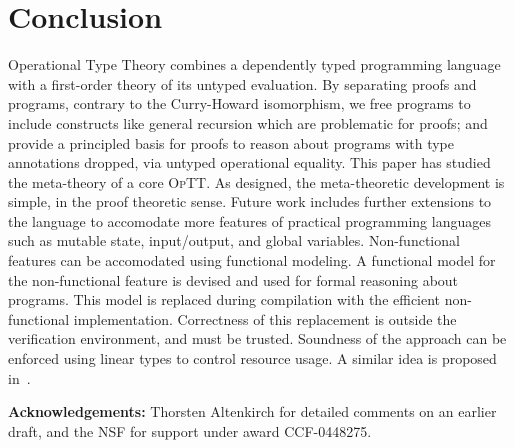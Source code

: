 \documentclass{fundam}
\newcommand{\optt}{\textsc{OpTT}}
\begin{document}
\section{Conclusion}

Operational Type Theory combines a dependently typed programming
language with a first-order theory of its untyped evaluation.  By
separating proofs and programs, contrary to the Curry-Howard
isomorphism, we free programs to include constructs like general
recursion which are problematic for proofs; and provide a principled
basis for proofs to reason about programs with type annotations
dropped, via untyped operational equality.  This paper has studied the
meta-theory of a core \optt.  As designed, the meta-theoretic
development is simple, in the proof theoretic sense.  Future work
includes further extensions to the language to accomodate more
features of practical programming languages such as mutable state,
input/output, and global variables.  Non-functional features can be
accomodated using functional modeling.  A functional model for the
non-functional feature is devised and used for formal reasoning about
programs.  This model is replaced during compilation with the
efficient non-functional implementation.  Correctness of this
replacement is outside the verification environment, and must be
trusted.  Soundness of the approach can be enforced using linear types
to control resource usage.  A similar idea is proposed
in~\cite{swierstra+07}.

\textbf{Acknowledgements:} Thorsten Altenkirch for detailed comments
on an earlier draft, and the NSF for support under award CCF-0448275.



\nocite{HG91}

\end{document}

